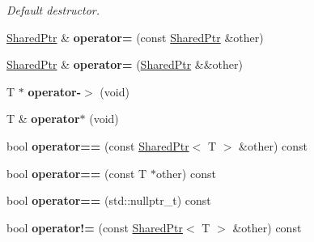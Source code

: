 \begin{DoxyCompactItemize}
\begin{DoxyCompactList}\small\item\em Default destructor. \end{DoxyCompactList}\item 
\hypertarget{classsnuffbox_1_1_shared_ptr_a9961287bcae6ca51a38b2b562e7e3be6}{\hyperlink{classsnuffbox_1_1_shared_ptr}{Shared\-Ptr} \& {\bfseries operator=} (const \hyperlink{classsnuffbox_1_1_shared_ptr}{Shared\-Ptr} \&other)}\label{classsnuffbox_1_1_shared_ptr_a9961287bcae6ca51a38b2b562e7e3be6}

\item 
\hypertarget{classsnuffbox_1_1_shared_ptr_ad840a9a7a7b36a457dac8d65bf1d5302}{\hyperlink{classsnuffbox_1_1_shared_ptr}{Shared\-Ptr} \& {\bfseries operator=} (\hyperlink{classsnuffbox_1_1_shared_ptr}{Shared\-Ptr} \&\&other)}\label{classsnuffbox_1_1_shared_ptr_ad840a9a7a7b36a457dac8d65bf1d5302}

\item 
\hypertarget{classsnuffbox_1_1_shared_ptr_a29e7a5e52d8c5e74d28adc28ff9a6e3b}{T $\ast$ {\bfseries operator-\/$>$} (void)}\label{classsnuffbox_1_1_shared_ptr_a29e7a5e52d8c5e74d28adc28ff9a6e3b}

\item 
\hypertarget{classsnuffbox_1_1_shared_ptr_ababc077f3967c39d36db1d2f06831602}{T \& {\bfseries operator$\ast$} (void)}\label{classsnuffbox_1_1_shared_ptr_ababc077f3967c39d36db1d2f06831602}

\item 
\hypertarget{classsnuffbox_1_1_shared_ptr_a4aada4171efd1890571faf8e08f0a6e5}{bool {\bfseries operator==} (const \hyperlink{classsnuffbox_1_1_shared_ptr}{Shared\-Ptr}$<$ T $>$ \&other) const }\label{classsnuffbox_1_1_shared_ptr_a4aada4171efd1890571faf8e08f0a6e5}

\item 
\hypertarget{classsnuffbox_1_1_shared_ptr_a8adc462fb2c53162745e735658bbc621}{bool {\bfseries operator==} (const T $\ast$other) const }\label{classsnuffbox_1_1_shared_ptr_a8adc462fb2c53162745e735658bbc621}

\item 
\hypertarget{classsnuffbox_1_1_shared_ptr_ad52060b9d84ceed978c8ad158c533188}{bool {\bfseries operator==} (std\-::nullptr\-\_\-t) const }\label{classsnuffbox_1_1_shared_ptr_ad52060b9d84ceed978c8ad158c533188}

\item 
\hypertarget{classsnuffbox_1_1_shared_ptr_a82b1278cc41e288eee3ac78f3ea8c155}{bool {\bfseries operator!=} (const \hyperlink{classsnuffbox_1_1_shared_ptr}{Shared\-Ptr}$<$ T $>$ \&other) const }\label{classsnuffbox_1_1_shared_ptr_a82b1278cc41e288eee3ac78f3ea8c155}


\end{DoxyCompactItemize}
